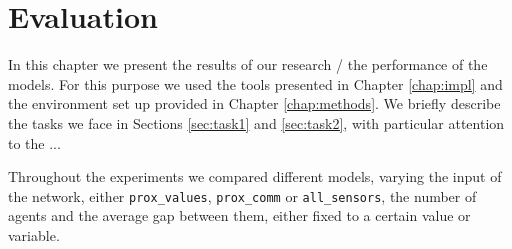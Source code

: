 \chapter{Evaluation}
\label{chap:experiments}

In this chapter we present the results of our research / the performance of the 
models. 
For this purpose we used the tools presented in Chapter \ref{chap:impl} and the 
environment set up provided in Chapter \ref{chap:methods}.
We briefly describe the tasks we face in Sections \ref{sec:task1} and \ref{sec:task2}, 
with particular attention to the ...

Throughout the experiments we compared different models, varying the input of 
the network, either \texttt{prox\_values}, \texttt{prox\_comm} or 
\texttt{all\_sensors}, the number of agents and the average gap between them, 
either fixed to a certain value or variable.



